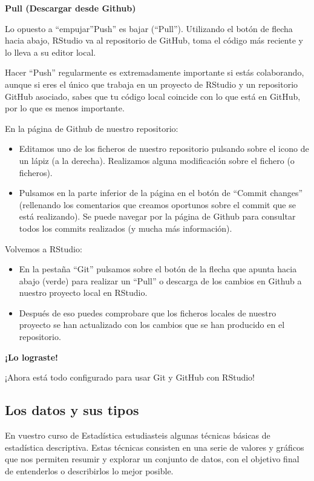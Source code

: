 \documentclass[
  letterpaper,
  DIV=11,
  numbers=noendperiod]{scrreprt}
\begin{document}
\textbf{Pull (Descargar desde Github)}

Lo opuesto a ``empujar''Push'' es bajar (``Pull''). Utilizando el botón
de flecha hacia abajo, RStudio va al repositorio de GitHub, toma el
código más reciente y lo lleva a su editor local.

Hacer ``Push'' regularmente es extremadamente importante si estás
colaborando, aunque si eres el único que trabaja en un proyecto de
RStudio y un repositorio GitHub asociado, sabes que tu código local
coincide con lo que está en GitHub, por lo que es menos importante.

En la página de Github de nuestro repositorio:

\begin{itemize}
\item
  Editamos uno de los ficheros de nuestro repositorio pulsando sobre el
  icono de un lápiz (a la derecha). Realizamos alguna modificación sobre
  el fichero (o ficheros).
\item
  Pulsamos en la parte inferior de la página en el botón de ``Commit
  changes'' (rellenando los comentarios que creamos oportunos sobre el
  commit que se está realizando). Se puede navegar por la página de
  Github para consultar todos los commits realizados (y mucha más
  información).
\end{itemize}

Volvemos a RStudio:

\begin{itemize}
\item
  En la pestaña ``Git'' pulsamos sobre el botón de la flecha que apunta
  hacia abajo (verde) para realizar un ``Pull'' o descarga de los
  cambios en Github a nuestro proyecto local en RStudio.
\item
  Después de eso puedes comprobare que los ficheros locales de nuestro
  proyecto se han actualizado con los cambios que se han producido en el
  repositorio.
\end{itemize}

\textbf{¡Lo lograste!}

¡Ahora está todo configurado para usar Git y GitHub con RStudio!

\hypertarget{los-datos-y-sus-tipos}{%
\subsection{Los datos y sus tipos}\label{los-datos-y-sus-tipos}}

En vuestro curso de Estadística estudiasteis algunas técnicas básicas de
estadística descriptiva. Estas técnicas consisten en una serie de
valores y gráficos que nos permiten resumir y explorar un conjunto de
datos, con el objetivo final de entenderlos o describirlos lo mejor
posible.
\end{document}
